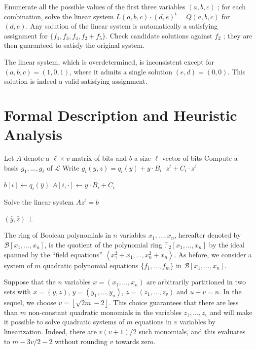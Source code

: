 \documentclass[a4paper,UKenglish,cleveref, autoref]{lipics-v2019}
\newcommand{\bits}{\left\{0, 1\right\}}
\begin{document}
Enumerate all the possible values of the first three variables $(a, b, c)$ ; for
each combination, solve the linear system $L(a,b,c) \cdot (d,e)^t = Q(a,b,c)$
for $(d,e)$. Any solution of the linear system is automatically a satisfying
assignment for $\{f_1, f_3, f_4, f_2 + f_5\}$. Check candidate solutions against
$f_2$ ; they are then guaranteed to satisfy the original system.

The linear system, which is overdetermined, is inconsistent except for
$(a,b,c) = (1,0,1)$, where it admits a single solution $(e, d) = (0, 0)$. This
solution is indeed a valid satisfying assignment.

\section{Formal Description and Heuristic Analysis}
\label{sec:description}

\begin{algorithm}[t]
  \caption{\label{the-algo}}
  \begin{algorithmic}[1]
    \State Let $A$ denote a $\ell \times v$ matrix of bits and $b$ a size-$\ell$
    vector of bits
    \State Compute a basis $g_1, \dots, g_\ell$ of $\mathcal{L}$
    \State Write $g_i(y, z) = q_i(y) + y\cdot B_i \cdot z^t + C_i \cdot z^t$
    \For{$\hat y \in \bits^u$}
    
    \State $b[i] \gets  q_i(\hat y)$
    \State $A[i, \cdot] \gets \hat y \cdot B_i + C_i$
    \EndFor
    
    \State Solve the linear system $Az^t = b$
    
    \State \Return $(\hat y, \hat z)$
    \EndIf
    \EndFor
    \EndFor
    \State \Return $\bot$
  \end{algorithmic}
\end{algorithm}

The ring of Boolean polynomials in $n$ variables $x_1, \dots, x_n$, hereafter
denoted by $\mathcal{B}[x_1, \dots, x_n]$, is the quotient of the polynomial
ring $\mathbb{F}_2[x_1, \dots, x_n]$ by the ideal spanned by the ``field
equations'' $\left\langle x_1^2 + x_1, \dots, x_n^2 + x_n\right\rangle$.  As
before, we consider a system of $m$ quadratic polynomial equations
$\{f_1, \dots, f_m\}$ in $\mathcal{B}[x_1, \dots, x_n]$.

Suppose that the $n$ variables $x = (x_1, \dots, x_n)$ are arbitrarily
partitioned in two sets with $x = (y, z)$, $y = (y_1, \dots, y_{u})$,
$z = (z_1, \dots, z_{v})$ and $u + v = n$. In the sequel, we choose
$v = \left\lfloor \sqrt{2m} - 2 \right\rfloor$. This choice guarantees that
there are less than $m$ non-constant quadratic monomials in the variables
$z_1, \dots, z_v$ and will make it possible to solve quadratic systems of $m$
equations in $v$ variables by linearization. Indeed, there are $v(v+1)/2$ such
monomials, and this evaluates to $m - 3v/2 - 2$ without rounding $v$ towards
zero.
\end{document}
